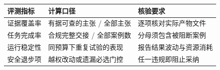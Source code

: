 \begin{tabular}{@{}P{3.0cm}P{4.6cm}P{4.9cm}@{}}
\toprule
\textbf{评测指标} & \textbf{计算口径} & \textbf{核验要求} \\
\midrule
证据覆盖率 & 有据可查的主张 / 全部主张 & 逐项核对实际产物文件 \\
任务完成率 & 合规完整交接 / 全部案例数 & 分母须包含被阻断案例 \\
运行稳定性 & 同预算下重复试验的表现 & 报告结果波动与资源消耗 \\
安全退步项 & 越权改动或遗漏必选门控 & 任一违规即阻止采纳 \\
\bottomrule
\end{tabular}
